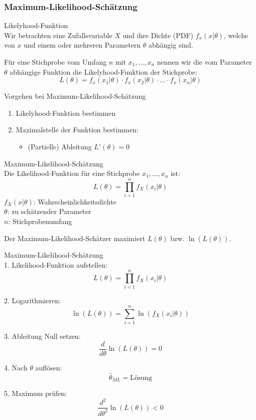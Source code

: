 \subsubsection{Maximum-Likelihood-Schätzung}

\begin{definition}{Likelyhood-Funktion}\\
Wir betrachten eine Zufallsvariable $X$ und ihre Dichte (PDF) $f_x(x|\theta)$, welche von $x$ und einem oder mehreren Parametern $\theta$ abhängig sind. 

Für eine Stichprobe vom Umfang $n$ mit $x_1,\ldots,x_n$ nennen wir die vom Parameter $\theta$ abhängige Funktion die Likelyhood-Funktion der Stichprobe:
$$
L(\theta)=f_x(x_1|\theta) \cdot f_x(x_2|\theta) \cdot \ldots \cdot f_x(x_n|\theta)
$$
\end{definition}

\begin{concept}{Vorgehen bei Maximum-Likelihood-Schätzung}\\
\begin{enumerate}
  \item Likelyhood-Funktion bestimmen
  \item Maximalstelle der Funktion bestimmen:
        \begin{itemize}
           \item (Partielle) Ableitung $L'(\theta)=0$
        \end{itemize}
\end{enumerate}
\end{concept}

\begin{definition}{Maximum-Likelihood-Schätzung}\\
Die Likelihood-Funktion für eine Stichprobe $x_1,\ldots,x_n$ ist:
$$
L(\theta)=\prod_{i=1}^n f_X(x_i|\theta)
$$
$f_X(x|\theta)$: Wahrscheinlichkeitsdichte\\
$\theta$: zu schätzender Parameter\\
$n$: Stichprobenumfang

Der Maximum-Likelihood-Schätzer maximiert $L(\theta)$ bzw. $\ln(L(\theta))$.
\end{definition}

\begin{KR}{Maximum-Likelihood-Schätzung}\\
1. Likelihood-Funktion aufstellen:
   $$L(\theta)=\prod_{i=1}^n f_X(x_i|\theta)$$

2. Logarithmieren:
   $$\ln(L(\theta))=\sum_{i=1}^n \ln(f_X(x_i|\theta))$$

3. Ableitung Null setzen:
   $$\frac{d}{d\theta}\ln(L(\theta))=0$$

4. Nach $\theta$ auflösen:
   $$\hat{\theta}_{ML}=\text{Lösung}$$

5. Maximum prüfen:
   $$\frac{d^2}{d\theta^2}\ln(L(\theta)) < 0$$
\end{KR}

